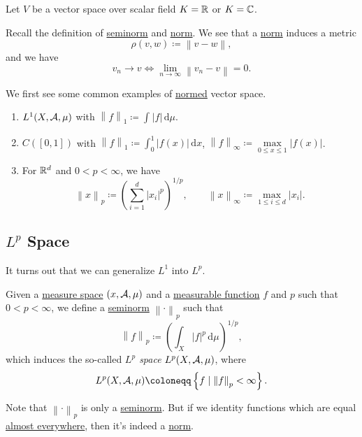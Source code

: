 Let \(V\) be a vector space over scalar field \(K = \mathbb{\MakeUppercase{r}} \) or \(K = \mathbb{\MakeUppercase{c}} \).
\begin{prev}
	Recall the definition of \hyperref[def:seminorm]{seminorm} and \hyperref[def:norm]{norm}. We see that a \hyperref[def:norm]{norm} induces a metric
	\[
		\rho (v, w) \coloneqq \left\lVert v - w\right\rVert,
	\]
	and we have
	\[
		v_{n} \to v \iff \lim\limits_{n \to \infty} \left\lVert v_{n} - v\right\rVert = 0.
	\]
\end{prev}

\begin{eg}
	We first see some common examples of \hyperref[def:norm]{normed} vector space.
	\begin{enumerate}
		\item \(L^1(X, \mathcal{\MakeUppercase{a}}  , \mu )\) with \(\left\lVert f\right\rVert _1 \coloneqq \int_{}^{} \left\vert f \right\vert  \,\mathrm{d}\mu  \).
		\item \(C([0, 1])\) with \(\left\lVert f\right\rVert _1 \coloneqq \int_{0}^{1} \left\vert f(x) \right\vert  \,\mathrm{d}x \), \(\left\lVert f\right\rVert _\infty \coloneqq \mathop{\max}\limits_{0\leq x\leq 1}\left\vert f(x) \right\vert \).
		\item For \(\mathbb{\MakeUppercase{r}} ^d\) and \(0 < p < \infty \), we have
		      \[
			      \left\lVert x\right\rVert _p \coloneqq \left(\sum\limits_{i=1}^{d} \left\vert x_{i}  \right\vert^p \right)^{1/p},\qquad \left\lVert x\right\rVert _\infty \coloneqq \mathop{\max} _{1\leq i\leq d}\left\vert x_{i}  \right\vert.
		      \]
	\end{enumerate}
\end{eg}

\subsection{\(L^{p} \) Space}
It turns out that we can generalize \hyperref[def:L1-space]{\(L^1\)} into \(L^p\).
\begin{definition}[\(L^p\) space]\label{def:L-p-space}
	Given a \hyperref[def:measure-space]{measure space} \((x, \mathcal{\MakeUppercase{a}} , \mu )\) and a \hyperref[def:measurable-function]{measurable function} \(f\) and \(p\) such that
	\(0 < p < \infty \), we define a \hyperref[def:seminorm]{seminorm} \(\left\lVert \cdot\right\rVert _p\) such that
	\[
		\left\lVert f\right\rVert _p \coloneqq \left(\int _X \left\vert f \right\vert ^p \,\mathrm{d} \mu \right)^{1/p},
	\]
	which induces the so-called \emph{\(L^p\) space} \(L^p(X, \mathcal{\MakeUppercase{a}} , \mu )\), where
	\[
		L^p(X, \mathcal{\MakeUppercase{a}} , \mu ) \coloneqq \left\{f\mid \left\lVert f\right\rVert _p < \infty \right\}.
	\]
\end{definition}
\begin{remark}
	Note that \(\left\lVert \cdot\right\rVert _p\) is only a \hyperref[def:seminorm]{seminorm}. But if we identity functions which are equal \hyperref[def:mu-almost-everywhere]{almost everywhere},
	then it's indeed a \hyperref[def:norm]{norm}.
\end{remark}

